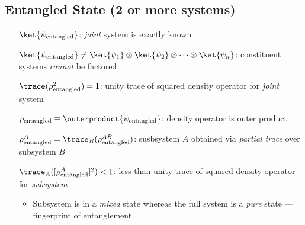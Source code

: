 \subsection*{Entangled State (2 or more systems)}
\begin{itemize}
\item [$\ket{\psi_{\text{entangled}}}$:] \emph{joint} system is exactly
  known
\item [$\ket{\psi_{\text{entangled}}} \neq \ket{\psi_1}\otimes\ket{\psi_2}\otimes
  \dotsm \otimes \ket{\psi_n}$:] constituent systems \emph{cannot} be factored 
\item [$\trace(\rho_{\text{entangled}}^2) = 1$:] unity trace of squared
  density operator for \emph{joint} system
\item [$\rho_{\text{entangled}} \equiv
  \outerproduct{\psi_{\text{entangled}}}$:] density operator is outer
  product
\item [$\rho_{\text{entangled}}^A = \trace_B(\rho_{\text{entangled}}^{AB})$:]
      susbsystem $A$ obtained via \emph{partial trace} over subsystem $B$
\item [$\trace_A([{\rho_{\text{entangled}}^A]^2}) < 1$:] less than unity trace of
  squared density operator for \emph{subsystem}
  \begin{itemize}
  \item Subsystem is in a \emph{mixed} state whereas the full system is a
    \emph{pure} state --- fingerprint of entanglement
  \end{itemize}
\end{itemize}
  
